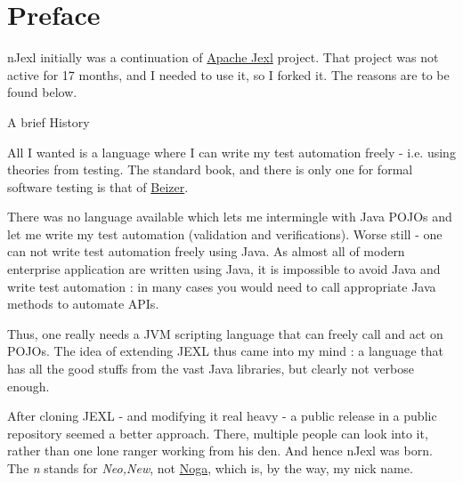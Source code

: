 \chapter{Preface}
 
{\LARGE n}Jexl initially was a continuation of \href{http://commons.apache.org/proper/commons-jexl}{Apache Jexl} project.
That project was not active for 17 months, and I needed to use it, so I forked it. The reasons are to be found below.

\begin{subsection}{A brief History}

All I wanted is a language where I can write my test automation freely - i.e. using theories from testing.
The standard book, and there is only one for formal software testing is 
that of \href{http://www.amazon.com/Software-Testing-Techniques-2nd-Edition/dp/1850328803}{Beizer}.

There was no language available which lets me intermingle with Java POJOs and let me write my test automation (validation and verifications). 
Worse still - one can not write test automation freely using Java. 
As almost all of modern enterprise application are written using Java, it is impossible to avoid Java 
and write test automation : in many cases you would need to call appropriate Java methods to automate APIs.

Thus, one really needs a JVM scripting language that can freely call and act on POJOs.
The idea of extending JEXL thus came into my mind : a language that has all the good stuffs from
the vast Java libraries, but clearly not verbose enough.

After cloning JEXL - and modifying it real heavy - a public release in a public repository
seemed a better approach. There, multiple people can look into it, rather than one lone ranger working from his den.
And hence nJexl was born. The \emph{n} stands for \emph{Neo,New}, 
not \href{https://nmandalh.wordpress.com}{Noga}, which is, by the way, my nick name.

\end{subsection}

